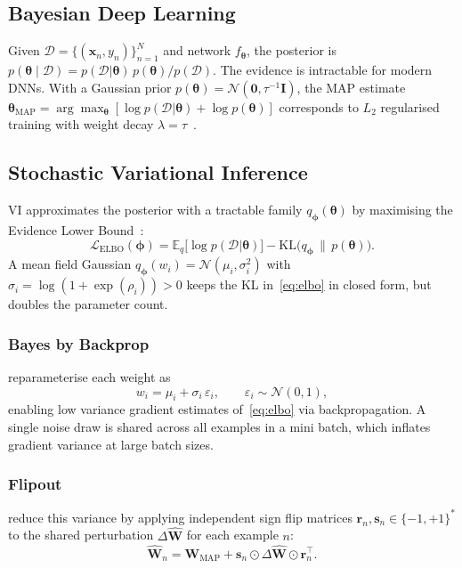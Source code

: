 \documentclass[conference]{IEEEtran}
\newcommand{\btheta}{\bm{\theta}}
\newcommand{\cD}{\mathcal{D}}
\newcommand{\cN}{\mathcal{N}}
\newcommand{\KL}{\mathrm{KL}}
\newcommand{\ELBO}{\mathcal{L}_{\text{ELBO}}}
\newcommand{\MAP}{\text{MAP}}
\begin{document}
\subsection{Bayesian Deep Learning}

Given $\cD = \{(\bm{x}_n, y_n)\}_{n=1}^{N}$ and network $f_{\btheta}$, the
posterior is $p(\btheta \mid \cD) = p(\cD|\btheta)\,p(\btheta)/p(\cD)$.
The evidence is intractable for modern DNNs. With a Gaussian prior
$p(\btheta)=\cN(\bm{0},\tau^{-1}\mathbf{I})$, the MAP estimate
$\btheta_{\MAP} = \arg\max_{\btheta}[\log p(\cD|\btheta)+\log p(\btheta)]$
corresponds to $L_2$ regularised training with weight decay
$\lambda=\tau$~\citep{murphy2023pml}.

\subsection{Stochastic Variational Inference}

VI approximates the posterior with a tractable family $q_{\bm\phi}(\btheta)$
by maximising the Evidence Lower Bound~\citep{blundell2015weight,goan2020bayesian}:
\begin{equation}
  \ELBO(\bm\phi)
    = \mathbb{E}_{q}\!\bigl[\log p(\cD|\btheta)\bigr]
    - \KL\bigl(q_{\bm\phi}\,\|\,p(\btheta)\bigr).
\label{eq:elbo}
\end{equation}
A mean field Gaussian $q_{\bm\phi}(w_i) = \cN(\mu_i,\sigma_i^2)$ with
$\sigma_i = \log(1+\exp(\rho_i))>0$ keeps the KL in~\eqref{eq:elbo} in
closed form, but doubles the parameter count.

\subsubsection{Bayes by Backprop}

\citet{blundell2015weight} reparameterise each weight as
\begin{equation}
  w_i = \mu_i + \sigma_i\,\varepsilon_i, \qquad \varepsilon_i\sim\cN(0,1),
\end{equation}
enabling low variance gradient estimates of~\eqref{eq:elbo} via
backpropagation.
A single noise draw is shared across all examples in a
mini batch, which inflates gradient variance at large batch sizes.

\subsubsection{Flipout}

\citet{wen2018flipout} reduce this variance by applying independent sign flip
matrices $\mathbf{r}_n,\mathbf{s}_n\in\{-1,+1\}^*$ to the shared
perturbation $\Delta\hat{\mathbf{W}}$ for each example $n$:
\begin{equation}
  \hat{\mathbf{W}}_n
    = \mathbf{W}_{\MAP} + \mathbf{s}_n \odot \Delta\hat{\mathbf{W}}
      \odot \mathbf{r}_n^{\!\top}.
\end{equation}
\end{document}
